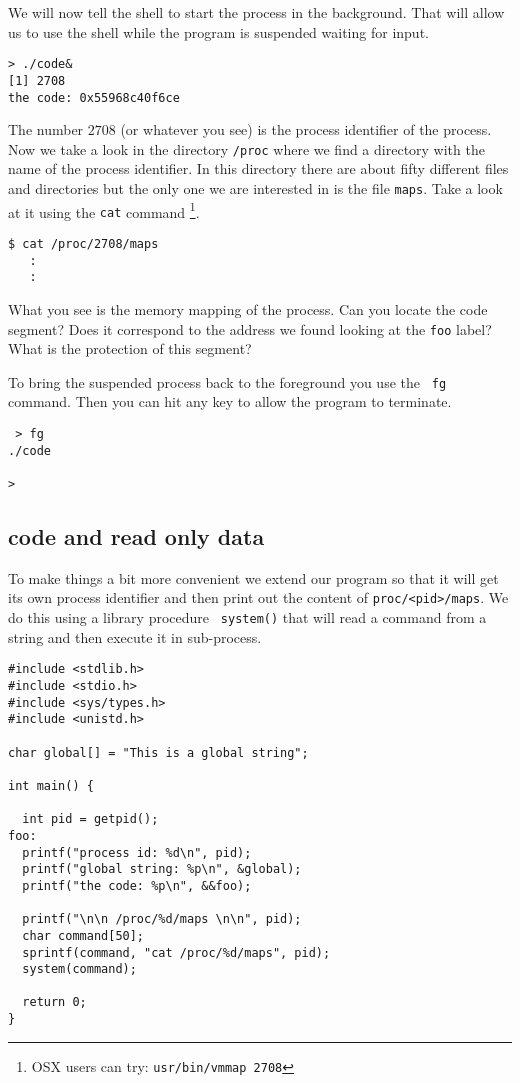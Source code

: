\documentclass[a4paper,11pt]{article}
\begin{document}
We will now tell the shell to start the process in the
background. That will allow us to use the shell while the program is
suspended waiting for input.

\begin{verbatim}
> ./code&
[1] 2708
the code: 0x55968c40f6ce
\end{verbatim}

The number $2708$ (or whatever you see) is the process identifier of
the process. Now we take a look in the directory {\tt /proc} where we find a
directory with the name of the process identifier. In this directory
there are about fifty different files and directories but the only
one we are interested in is the file {\tt maps}. Take a look at it
using the {\tt cat} command \footnote{OSX users can try: {\tt usr/bin/vmmap 2708}}.

\begin{verbatim}
$ cat /proc/2708/maps
   :
   :
\end{verbatim}

What you see is the memory mapping of the process. Can you locate the
code segment? Does it correspond to the address we found looking at the
{\tt foo} label? What is the protection of this segment?

To bring the suspended process back to the foreground you use the {\tt
  fg} command. Then you can hit any key to allow the program to
terminate.

\begin{verbatim}
 > fg
./code

>
\end{verbatim}


\subsection{code and read only data}

To make things a bit more convenient we extend our program so that it
will get its own process identifier and then print out the content of
{\tt proc/<pid>/maps}. We do this using a library procedure {\tt
  system()} that will read a command from a string and then execute it
in sub-process. 

\begin{lstlisting}
#include <stdlib.h>
#include <stdio.h>
#include <sys/types.h>
#include <unistd.h>

char global[] = "This is a global string";

int main() {

  int pid = getpid();
foo:
  printf("process id: %d\n", pid);
  printf("global string: %p\n", &global);
  printf("the code: %p\n", &&foo);    
  
  printf("\n\n /proc/%d/maps \n\n", pid);
  char command[50];
  sprintf(command, "cat /proc/%d/maps", pid);
  system(command);  

  return 0;
}
\end{lstlisting}
\end{document}
